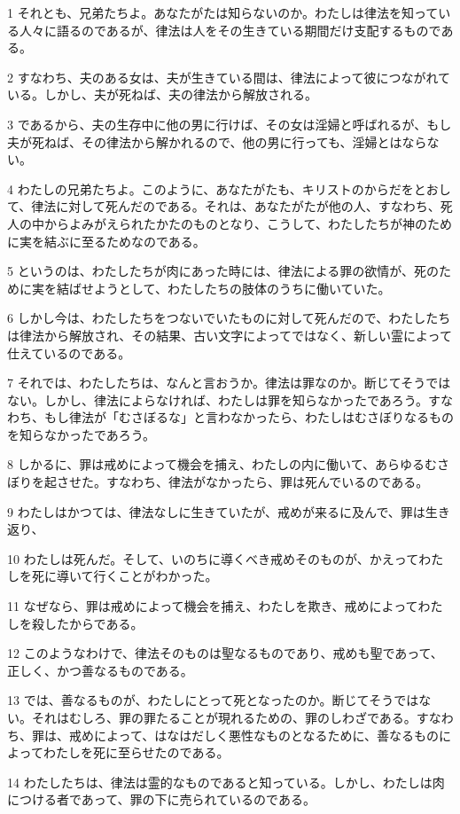 \par 1 それとも、兄弟たちよ。あなたがたは知らないのか。わたしは律法を知っている人々に語るのであるが、律法は人をその生きている期間だけ支配するものである。
\par 2 すなわち、夫のある女は、夫が生きている間は、律法によって彼につながれている。しかし、夫が死ねば、夫の律法から解放される。
\par 3 であるから、夫の生存中に他の男に行けば、その女は淫婦と呼ばれるが、もし夫が死ねば、その律法から解かれるので、他の男に行っても、淫婦とはならない。
\par 4 わたしの兄弟たちよ。このように、あなたがたも、キリストのからだをとおして、律法に対して死んだのである。それは、あなたがたが他の人、すなわち、死人の中からよみがえられたかたのものとなり、こうして、わたしたちが神のために実を結ぶに至るためなのである。
\par 5 というのは、わたしたちが肉にあった時には、律法による罪の欲情が、死のために実を結ばせようとして、わたしたちの肢体のうちに働いていた。
\par 6 しかし今は、わたしたちをつないでいたものに対して死んだので、わたしたちは律法から解放され、その結果、古い文字によってではなく、新しい霊によって仕えているのである。
\par 7 それでは、わたしたちは、なんと言おうか。律法は罪なのか。断じてそうではない。しかし、律法によらなければ、わたしは罪を知らなかったであろう。すなわち、もし律法が「むさぼるな」と言わなかったら、わたしはむさぼりなるものを知らなかったであろう。
\par 8 しかるに、罪は戒めによって機会を捕え、わたしの内に働いて、あらゆるむさぼりを起させた。すなわち、律法がなかったら、罪は死んでいるのである。
\par 9 わたしはかつては、律法なしに生きていたが、戒めが来るに及んで、罪は生き返り、
\par 10 わたしは死んだ。そして、いのちに導くべき戒めそのものが、かえってわたしを死に導いて行くことがわかった。
\par 11 なぜなら、罪は戒めによって機会を捕え、わたしを欺き、戒めによってわたしを殺したからである。
\par 12 このようなわけで、律法そのものは聖なるものであり、戒めも聖であって、正しく、かつ善なるものである。
\par 13 では、善なるものが、わたしにとって死となったのか。断じてそうではない。それはむしろ、罪の罪たることが現れるための、罪のしわざである。すなわち、罪は、戒めによって、はなはだしく悪性なものとなるために、善なるものによってわたしを死に至らせたのである。
\par 14 わたしたちは、律法は霊的なものであると知っている。しかし、わたしは肉につける者であって、罪の下に売られているのである。
